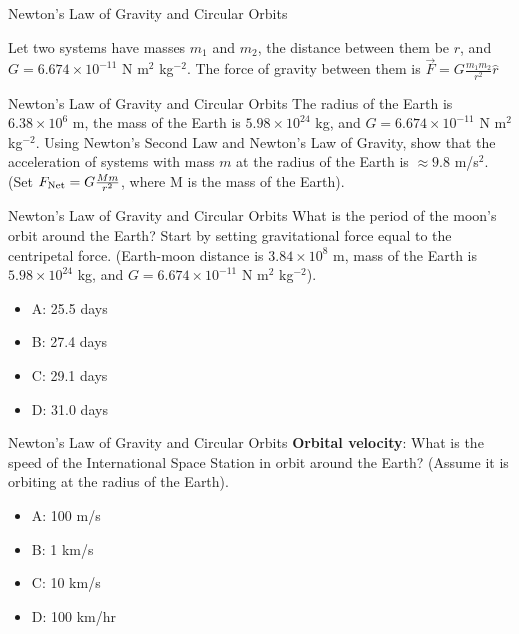 \documentclass{beamer}
\begin{document}
\begin{frame}{Newton's Law of Gravity and Circular Orbits}
\begin{tcolorbox}[colback=white,colframe=red!40!blue,title=Newton's Law of Gravitation]
\alert{Let two systems have masses $m_1$ and $m_2$, the distance between them be $r$, and $G = 6.674\times 10^{-11}$ N m$^2$ kg$^{-2}$.  The force of gravity between them is}\vspace{0.2cm}
\alert{$\vec{F} = G\frac{m_1 m_2}{r^2}\hat{r}$}
\end{tcolorbox}
\end{frame}

\begin{frame}{Newton's Law of Gravity and Circular Orbits}
The radius of the Earth is $6.38\times 10^6$ m, the mass of the Earth is $5.98 \times 10^{24}$ kg, and $G = 6.674\times 10^{-11}$ N m$^2$ kg$^{-2}$.  Using Newton's Second Law and Newton's Law of Gravity, show that the acceleration of systems with mass $m$ at the radius of the Earth is $\approx 9.8$ m/s$^2$.\\
\vspace{0.2cm}
(Set $F_{\rm Net} = G\frac{Mm}{r^2}$, where M is the mass of the Earth).
\end{frame}

\begin{frame}{Newton's Law of Gravity and Circular Orbits}
What is the period of the moon's orbit around the Earth?  Start by setting gravitational force equal to the centripetal force.  (Earth-moon distance is $3.84\times 10^8$ m, mass of the Earth is $5.98 \times 10^{24}$ kg, and $G = 6.674\times 10^{-11}$ N m$^2$ kg$^{-2}$).
\begin{itemize}
\item A: 25.5 days
\item B: 27.4 days
\item C: 29.1 days
\item D: 31.0 days
\end{itemize}
\end{frame}

\begin{frame}{Newton's Law of Gravity and Circular Orbits}
\textbf{Orbital velocity}: What is the speed of the International Space Station in orbit around the Earth?  (Assume it is orbiting at the radius of the Earth).
\begin{itemize}
\item A: 100 m/s
\item B: 1 km/s
\item C: 10 km/s
\item D: 100 km/hr
\end{itemize}
\end{frame}
\end{document}
